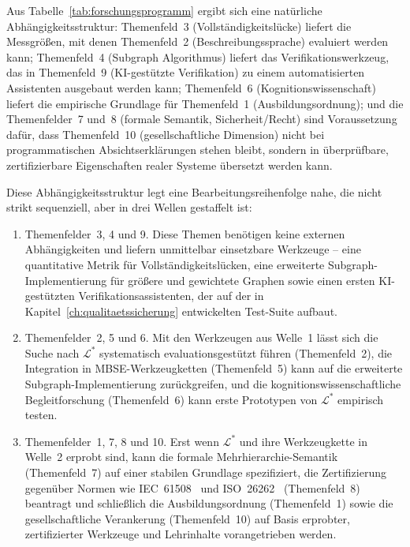 ﻿\documentclass[a4paper,12pt]{report}
\theoremstyle{definition}
\begin{document}
\noindent
Aus Tabelle~\ref{tab:forschungsprogramm} ergibt sich eine natürliche
Abhängigkeitsstruktur: Themenfeld~3 (Vollständigkeitslücke) liefert die
Messgrößen, mit denen Themenfeld~2 (Beschreibungssprache) evaluiert werden
kann; Themenfeld~4 (Subgraph Algorithmus) liefert das Verifikationswerkzeug,
das in Themenfeld~9 (KI-gestützte Verifikation) zu einem automatisierten
Assistenten ausgebaut werden kann; Themenfeld~6 (Kognitionswissenschaft)
liefert die empirische Grundlage für Themenfeld~1
(Ausbildungsordnung); und die Themenfelder~7 und~8 (formale Semantik,
Sicherheit/Recht) sind Voraussetzung dafür, dass Themenfeld~10
(gesellschaftliche Dimension) nicht bei programmatischen Absichtserklärungen
stehen bleibt, sondern in überprüfbare, zertifizierbare Eigenschaften realer
Systeme übersetzt werden kann.

Diese Abhängigkeitsstruktur legt eine Bearbeitungsreihenfolge nahe, die
nicht strikt sequenziell, aber in drei Wellen gestaffelt ist:

\begin{enumerate}
  \item[\textbf{Welle 1 (Jahre 1--2):}] Themenfelder~3, 4 und 9. Diese
  Themen benötigen keine externen Abhängigkeiten und liefern unmittelbar
  einsetzbare Werkzeuge -- eine quantitative Metrik für
  Vollständigkeitslücken, eine erweiterte Subgraph-Implementierung für
  größere und gewichtete Graphen sowie einen ersten KI-gestützten
  Verifikationsassistenten, der auf der in Kapitel~\ref{ch:qualitaetssicherung}
  entwickelten Test-Suite aufbaut.

  \item[\textbf{Welle 2 (Jahre 2--5):}] Themenfelder~2, 5 und 6. Mit den
  Werkzeugen aus Welle~1 lässt sich die Suche nach $\mathcal{L}^*$
  systematisch evaluationsgestützt führen (Themenfeld~2), die Integration
  in MBSE-Werkzeugketten (Themenfeld~5) kann auf die erweiterte
  Subgraph-Implementierung zurückgreifen, und die
  kognitionswissenschaftliche Begleitforschung (Themenfeld~6) kann erste
  Prototypen von $\mathcal{L}^*$ empirisch testen.

  \item[\textbf{Welle 3 (Jahre 5+):}] Themenfelder~1, 7, 8 und 10. Erst
  wenn $\mathcal{L}^*$ und ihre Werkzeugkette in Welle~2 erprobt sind, kann
  die formale Mehrhierarchie-Semantik (Themenfeld~7) auf einer stabilen
  Grundlage spezifiziert, die Zertifizierung gegenüber Normen wie
  IEC~61508~\cite{iec61508} und ISO~26262~\cite{iso26262} (Themenfeld~8)
  beantragt und schließlich die Ausbildungsordnung (Themenfeld~1) sowie die
  gesellschaftliche Verankerung (Themenfeld~10) auf Basis erprobter,
  zertifizierter Werkzeuge und Lehrinhalte vorangetrieben werden.
\end{enumerate}
\end{document}
